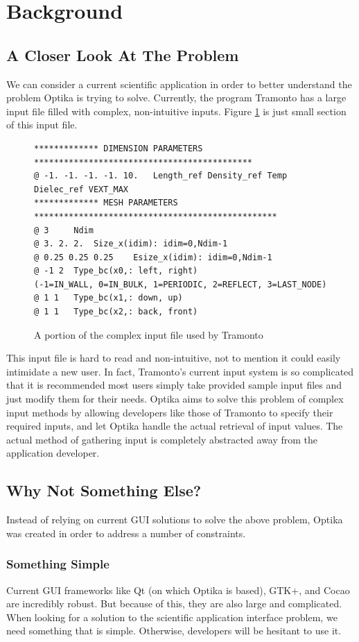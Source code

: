 \section{Background}
\subsection{A Closer Look At The Problem}
We can consider a current scientific application in order to better understand the problem Optika is trying to solve. 
Currently, the program Tramonto has a large input file filled with complex, non-intuitive inputs. Figure
\ref{tramontoInputFigure} is just small section of this input file.
\begin{figure}
  \centering
  {\footnotesize
  \begin{Verbatim}
************* DIMENSION PARAMETERS ********************************************
@ -1. -1. -1. -1. 10. 	Length_ref Density_ref Temp Dielec_ref VEXT_MAX 
************* MESH PARAMETERS *************************************************
@ 3 	Ndim 
@ 3. 2. 2. 	Size_x(idim): idim=0,Ndim-1 
@ 0.25 0.25 0.25 	Esize_x(idim): idim=0,Ndim-1 
@ -1 2 	Type_bc(x0,: left, right) 
(-1=IN_WALL, 0=IN_BULK, 1=PERIODIC, 2=REFLECT, 3=LAST_NODE) 
@ 1 1 	Type_bc(x1,: down, up) 
@ 1 1 	Type_bc(x2,: back, front) 
  \end{Verbatim}
  }
  \caption[Tramonto Input]{A portion of the complex input file used by Tramonto}
  \label{tramontoInputFigure}
\end{figure}

This input file is hard to read and non-intuitive, not to mention it could 
easily intimidate a new user. In fact, Tramonto's current input system is so complicated
that it is recommended most users simply take provided sample input files and just
modify them for their needs. Optika aims to solve this problem of complex input methods by allowing developers
like those of Tramonto to specify their required inputs, and let Optika handle the actual retrieval of
input values. The actual method of gathering input is completely abstracted away from the application developer.

\subsection{Why Not Something Else?}
Instead of relying on current GUI solutions to solve the above problem, Optika was created in order to address
a number of constraints.

\subsubsection{Something Simple}
Current GUI frameworks like Qt (on which Optika is based), GTK+, and Cocao are incredibly robust. But
because of this, they are also large and complicated. When looking for a solution to the 
scientific application interface problem, we need something that is simple. Otherwise, developers will be hesitant to use it.

